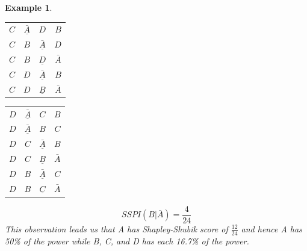 \documentclass[12pt]{article}
\newtheorem{example}[theorem]{Example}
\begin{document}
\begin{example}
\begin{center}
\begin{tabular}{ l c c r }
  $C$ & $\underline{\bar{A}}$ & $D$ & $B$\\
  $C$ & $B$ & $\underline{\bar{A}}$ & $D$\\
  $C$ & $B$ & $\underline{D}$ & $\bar{A}$\\
  $C$ & $D$ & $\underline{\bar{A}}$ & $B$\\
  $C$ & $D$ & $\underline{B}$ & $\bar{A}$\\
\end{tabular}
\end{center}
 \begin{center}
\begin{tabular}{ l c c r }
  $D$ & $\underline{\bar{A}}$ & $C$ & $B$\\
  $D$ & $\underline{\bar{A}}$ & $B$ & $C$\\
  $D$ & $C$ & $\underline{\bar{A}}$ & $B$\\
  $D$ & $C$ & $\underline{B}$ & $\bar{A}$\\
  $D$ & $B$ & $\underline{\bar{A}}$ & $C$\\
  $D$ & $B$ & $\underline{C}$ & $\bar{A}$\\
\end{tabular}
\end{center}
\begin{equation}
SSPI(B|\bar{A}) = \frac{4}{24}
\end{equation}
This observation leads us that A has Shapley-Shubik score of $\frac{12}{24}$ and hence A has 50\% of the power while B, C, and D has each 16.7\% of the power. 
\end{example} 
\end{document}
